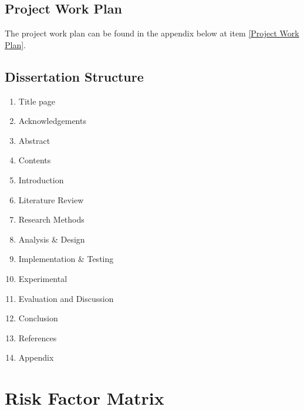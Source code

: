 \documentclass[12pt]{article}
\begin{document}
\subsection{Project Work Plan} 
The project work plan can be found in the appendix below at item \ref{Project Work Plan}.


\subsection{Dissertation Structure}
\begin{enumerate}[itemsep=0mm]
	\item Title page
	\item Acknowledgements
	\item Abstract
	\item Contents
	\item Introduction
	\item Literature Review
	\item Research Methods
	\item Analysis \& Design
	\item Implementation \& Testing
	\item Experimental
	\item Evaluation and Discussion
	\item Conclusion
	\item References
	\item Appendix
\end{enumerate}





\appendix
\section{Risk Factor Matrix} \label{Risk Factor Matrix}
\end{document}
